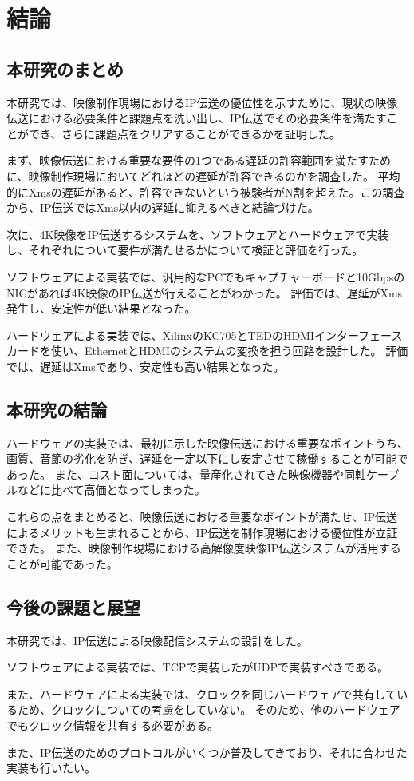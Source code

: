 \chapter{結論}
\label{chap:conclusion}

\section{本研究のまとめ}

本研究では、映像制作現場におけるIP伝送の優位性を示すために、現状の映像伝送における必要条件と課題点を洗い出し、IP伝送でその必要条件を満たすことができ、さらに課題点をクリアすることができるかを証明した。

まず、映像伝送における重要な要件の1つである遅延の許容範囲を満たすために、映像制作現場においてどれほどの遅延が許容できるのかを調査した。
平均的にXmsの遅延があると、許容できないという被験者がN割を超えた。この調査から、IP伝送ではXms以内の遅延に抑えるべきと結論づけた。

次に、4K映像をIP伝送するシステムを、ソフトウェアとハードウェアで実装し、それぞれについて要件が満たせるかについて検証と評価を行った。

ソフトウェアによる実装では、汎用的なPCでもキャプチャーボードと10GbpsのNICがあれば4K映像のIP伝送が行えることがわかった。
評価では、遅延がXms発生し、安定性が低い結果となった。

ハードウェアによる実装では、XilinxのKC705とTEDのHDMIインターフェースカードを使い、EthernetとHDMIのシステムの変換を担う回路を設計した。
評価では、遅延はXmsであり、安定性も高い結果となった。

\section{本研究の結論}

ハードウェアの実装では、最初に示した映像伝送における重要なポイントうち、画質、音節の劣化を防ぎ、遅延を一定以下にし安定させて稼働することが可能であった。
また、コスト面については、量産化されてきた映像機器や同軸ケーブルなどに比べて高価となってしまった。

これらの点をまとめると、映像伝送における重要なポイントが満たせ、IP伝送によるメリットも生まれることから、IP伝送を制作現場における優位性が立証できた。
また、映像制作現場における高解像度映像IP伝送システムが活用することが可能であった。

\newpage
\section{今後の課題と展望}

本研究では、IP伝送による映像配信システムの設計をした。

ソフトウェアによる実装では、TCPで実装したがUDPで実装すべきである。

また、ハードウェアによる実装では、クロックを同じハードウェアで共有しているため、クロックについての考慮をしていない。
そのため、他のハードウェアでもクロック情報を共有する必要がある。

また、IP伝送のためのプロトコルがいくつか普及してきており、それに合わせた実装も行いたい。
